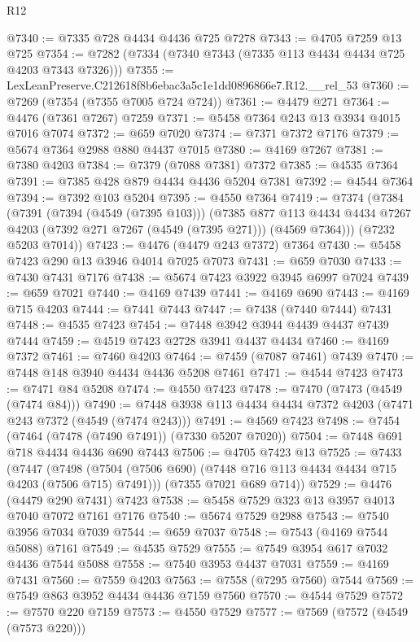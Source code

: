 \begin{lexlean}{R12}
\begin{coremodule}
@7340 := @7335 @728 @4434 @4436 @725 @7278
@7343 := @4705 @7259 @13 @725
@7354 := @7282 (@7334 (@7340 @7343 (@7335 @113 @4434 @4434 @725 @4203 @7343 @7326)))
@7355 := LexLeanPreserve.C212618f8b6ebac3a5c1e1dd0896866e7.R12.__rel_53
@7360 := @7269 (@7354 (@7355 @7005 @724 @724))
@7361 := @4479 @271
@7364 := @4476 (@7361 @7267) @7259
@7371 := @5458 @7364 @243 @13 @3934 @4015 @7016 @7074
@7372 := @659 @7020
@7374 := @7371 @7372 @7176
@7379 := @5674 @7364 @2988 @880 @4437 @7015
@7380 := @4169 @7267
@7381 := @7380 @4203
@7384 := @7379 (@7088 @7381) @7372
@7385 := @4535 @7364
@7391 := @7385 @428 @879 @4434 @4436 @5204 @7381
@7392 := @4544 @7364
@7394 := @7392 @103 @5204
@7395 := @4550 @7364
@7419 := @7374
    (@7384
      (@7391
        (@7394 (@4549 (@7395 @103)))
        (@7385
          @877
          @113
          @4434
          @4434
          @7267
          @4203
          (@7392 @271 @7267 (@4549 (@7395 @271)))
          (@4569 @7364)))
      (@7232 @5203 @7014))
@7423 := @4476 (@4479 @243 @7372) @7364
@7430 := @5458 @7423 @290 @13 @3946 @4014 @7025 @7073
@7431 := @659 @7030
@7433 := @7430 @7431 @7176
@7438 := @5674 @7423 @3922 @3945 @6997 @7024
@7439 := @659 @7021
@7440 := @4169 @7439
@7441 := @4169 @690
@7443 := @4169 @715 @4203
@7444 := @7441 @7443
@7447 := @7438 (@7440 @7444) @7431
@7448 := @4535 @7423
@7454 := @7448 @3942 @3944 @4439 @4437 @7439 @7444
@7459 := @4519 @7423 @2728 @3941 @4437 @4434
@7460 := @4169 @7372
@7461 := @7460 @4203
@7464 := @7459 (@7087 @7461) @7439
@7470 := @7448 @148 @3940 @4434 @4436 @5208 @7461
@7471 := @4544 @7423
@7473 := @7471 @84 @5208
@7474 := @4550 @7423
@7478 := @7470 (@7473 (@4549 (@7474 @84)))
@7490 := @7448 @3938 @113 @4434 @4434 @7372 @4203 (@7471 @243 @7372 (@4549 (@7474 @243)))
@7491 := @4569 @7423
@7498 := @7454 (@7464 (@7478 (@7490 @7491)) (@7330 @5207 @7020))
@7504 := @7448 @691 @718 @4434 @4436 @690 @7443
@7506 := @4705 @7423 @13
@7525 := @7433
    (@7447
      (@7498 (@7504 (@7506 @690) (@7448 @716 @113 @4434 @4434 @715 @4203 (@7506 @715) @7491)))
      (@7355 @7021 @689 @714))
@7529 := @4476 (@4479 @290 @7431) @7423
@7538 := @5458 @7529 @323 @13 @3957 @4013 @7040 @7072 @7161 @7176
@7540 := @5674 @7529 @2988
@7543 := @7540 @3956 @7034 @7039
@7544 := @659 @7037
@7548 := @7543 (@4169 @7544 @5088) @7161
@7549 := @4535 @7529
@7555 := @7549 @3954 @617 @7032 @4436 @7544 @5088
@7558 := @7540 @3953 @4437 @7031
@7559 := @4169 @7431
@7560 := @7559 @4203
@7563 := @7558 (@7295 @7560) @7544
@7569 := @7549 @863 @3952 @4434 @4436 @7159 @7560
@7570 := @4544 @7529
@7572 := @7570 @220 @7159
@7573 := @4550 @7529
@7577 := @7569 (@7572 (@4549 (@7573 @220)))

\end{coremodule}
\end{lexlean}
